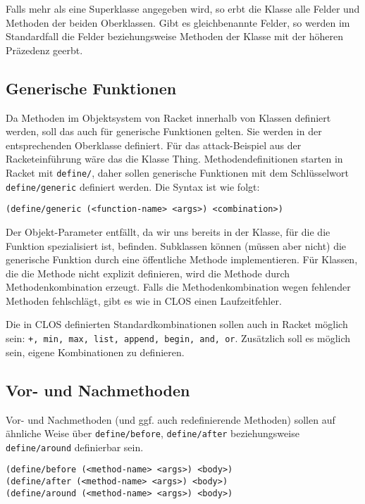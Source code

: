 Falls mehr als eine Superklasse angegeben wird, so erbt die Klasse alle Felder und Methoden der beiden Oberklassen. Gibt es gleichbenannte Felder, so werden im Standardfall die Felder beziehungsweise Methoden der Klasse mit der höheren Präzedenz geerbt.

\subsection{Generische Funktionen}
Da Methoden im Objektsystem von Racket innerhalb von Klassen definiert werden, soll das auch für generische Funktionen gelten. Sie werden in der entsprechenden Oberklasse definiert. Für das attack-Beispiel aus der Racketeinführung wäre das die Klasse Thing. Methodendefinitionen starten in Racket mit \texttt{define/}, daher sollen generische Funktionen mit dem Schlüsselwort \texttt{define/generic} definiert werden. Die Syntax ist wie folgt:

\texttt{(define/generic ({\textless}function-name{\textgreater} {\textless}args{\textgreater}) {\textless}combination{\textgreater})}

Der Objekt-Parameter entfällt, da wir uns bereits in der Klasse, für die die Funktion spezialisiert ist, befinden. Subklassen können (müssen aber nicht) die generische Funktion durch eine öffentliche Methode implementieren. Für Klassen, die die Methode nicht explizit definieren, wird die Methode durch Methodenkombination erzeugt. Falls die Methodenkombination wegen fehlender Methoden fehlschlägt, gibt es wie in CLOS einen Laufzeitfehler.

Die in CLOS definierten Standardkombinationen sollen auch in Racket möglich sein: \texttt{+, min, max, list, append, begin, and, or}. 
Zusätzlich soll es möglich sein, eigene Kombinationen zu definieren.


\subsection{Vor- und Nachmethoden}
Vor- und Nachmethoden (und ggf. auch redefinierende Methoden) sollen auf ähnliche Weise über \texttt{define/before}, \texttt{define/after} beziehungsweise \texttt{define/around} definierbar sein. 

\texttt{(define/before ({\textless}method-name{\textgreater} {\textless}args{\textgreater}) {\textless}body{\textgreater})}\\
\texttt{(define/after ({\textless}method-name{\textgreater} {\textless}args{\textgreater}) {\textless}body{\textgreater})}\\
\texttt{(define/around ({\textless}method-name{\textgreater} {\textless}args{\textgreater}) {\textless}body{\textgreater})}


